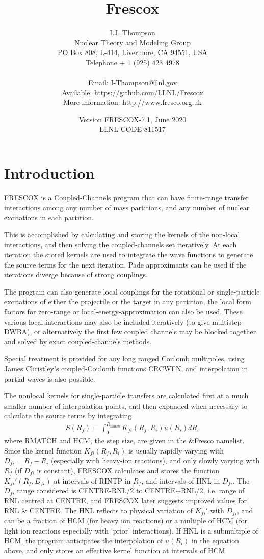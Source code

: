 \documentclass[11pt]{article}
\title{\Huge Frescox}
\date{Version FRESCOX-7.1, June 2020\\ LLNL-CODE-811517 }
\author{I.J. Thompson
%
\\Nuclear Theory and Modeling Group
\\PO Box 808, L-414,
 Livermore, CA 94551, USA
\\Telephone + 1 (925) 423 4978
\\ %
\\Email: I-Thompson@llnl.gov
\\Available: https://github.com/LLNL/Frescox
\\More information: http://www.fresco.org.uk }
\newcommand{\beqn}{\begin{eqnarray}}
\newcommand{\eeqn}{\end{eqnarray}}
\begin{document}
\maketitle
\tableofcontents
\newpage
\section{Introduction}

\parskip 5pt
\parindent 10pt

FRESCOX is a Coupled-Channels program that can have finite-range
transfer interactions among any number of mass partitions, and any
number of nuclear excitations in each partition.

This is accomplished by calculating and storing the kernels of the
non-local interactions, and then solving the coupled-channels set
iteratively.
At each iteration the stored kernels are used to integrate the wave
functions to generate the source terms for the next iteration.
Pade approximants can be used if the iterations diverge because of
strong couplings.

The program can also generate local couplings for the rotational
or single-particle excitations of either the projectile or the
target in any partition,
the local form factors for zero-range or local-energy-approximation
can also be used.
These various local interactions may also be included iteratively
(to give multistep DWBA), or alternatively the first few coupled
channels may be blocked together and solved by exact coupled-channels
methods.

Special treatment is provided for any long ranged Coulomb multipoles,
using James Christley's coupled-Coulomb functions CRCWFN,
and interpolation in partial waves is also possible.

The nonlocal kernels for single-particle transfers are calculated first
at a much smaller number of interpolation points,
and then expanded when necessary to calculate the source terms by
integrating
\beqn
S(R _ f ) = \int _ 0 ^ {R _ {match}}
                K _ {fi} (R _ f , R _ i ) u(R _ i ) dR _ i
\eeqn
where RMATCH and HCM, the step size, are given in the \&Fresco namelist.
Since the kernel function $K_{fi}(R_f,R_i)$ is usually rapidly varying with
$D_{fi} = R_{f} - R_{i}$ (especially with heavy-ion reactions), and only slowly
varying with $R_{f}$ (if $D_{fi}$ is constant),  FRESCOX calculates and stores
the function $K_{fi}'(R_{f},D_{fi})$ at intervals of RINTP in $R_{f}$,
and intervals of HNL in $D_{fi}$. The $D_{fi}$ range considered is
CENTRE-RNL/2 to CENTRE+RNL/2, i.e. range of RNL centred at CENTRE,
and FRESCOX later suggests improved values for RNL \& CENTRE.
The HNL reflects to physical variation of $K_{fi}'$ with $D_{fi}$, and can be
a fraction of HCM (for heavy ion reactions) or a multiple of HCM
(for light ion reactions especially with `prior' interactions).
If HNL is a submultiple of HCM, the program anticipates the interpolation
of $u(R_{i})$ in the equation above, and only stores an effective kernel
function at intervals of HCM.
\end{document}
